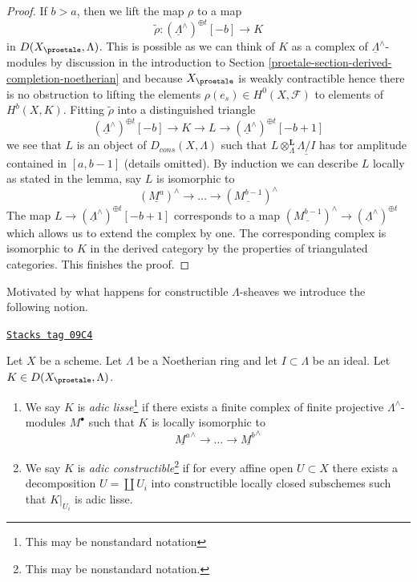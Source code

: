 \begin{proof}
\medskip\noindent
If $b > a$, then we lift the map $\rho$ to a map
$$
\tilde \rho : (\underline{\Lambda}^\wedge)^{\oplus t}[-b] \longrightarrow K
$$
in $D(X_\proetale, \Lambda)$. This is possible as we can think of
$K$ as a complex of $\underline{\Lambda}^\wedge$-modules by
discussion in the introduction to
Section \ref{proetale-section-derived-completion-noetherian}
and because $X_\proetale$ is weakly contractible
hence there is no obstruction to lifting the elements
$\rho(e_s) \in H^0(X, \mathcal{F})$ to elements of $H^b(X, K)$.
Fitting $\tilde \rho$ into a distinguished triangle
$$
(\underline{\Lambda}^\wedge)^{\oplus t}[-b] \to K \to L \to
(\underline{\Lambda}^\wedge)^{\oplus t}[-b + 1]
$$
we see that $L$ is an object of $D_{cons}(X, \Lambda)$ such
that $L \otimes_\Lambda^\mathbf{L} \underline{\Lambda/I}$
has tor amplitude contained in $[a, b - 1]$ (details omitted).
By induction we can describe $L$ locally as stated in the lemma, say
$L$ is isomorphic to
$$
(\underline{M^a})^\wedge \to \ldots \to (\underline{M^{b - 1}})^\wedge
$$
The map
$L \to (\underline{\Lambda}^\wedge)^{\oplus t}[-b + 1]$
corresponds to a map
$(\underline{M^{b - 1}})^\wedge \to (\underline{\Lambda}^\wedge)^{\oplus t}$
which allows us to extend the complex by one. The corresponding
complex is isomorphic to $K$ in the derived category by the properties
of triangulated categories. This finishes the proof.
\end{proof}

Motivated by what happens for constructible $\Lambda$-sheaves
we introduce the following notion.

\begin{definition}
\label{proetale-definition-adic-constructible}
\href{https://stacks.math.columbia.edu/tag/09C4}{\texttt{Stacks tag 09C4}}

Let $X$ be a scheme. Let $\Lambda$ be a Noetherian ring and let
$I \subset \Lambda$ be an ideal. Let $K \in D(X_\proetale, \Lambda)$.
\begin{enumerate}
\item We say $K$ is {\it adic lisse}\footnote{This may be
nonstandard notation} if there exists a finite complex of finite
projective $\Lambda^\wedge$-modules $M^\bullet$ such that
$K$ is locally isomorphic to
$$
\underline{M^a}^\wedge \to \ldots \to \underline{M^b}^\wedge
$$
\item We say $K$ is {\it adic constructible}\footnote{This may be
nonstandard notation.} if for every affine open $U \subset X$
there exists a decomposition $U = \coprod U_i$ into
constructible locally closed subschemes such that $K|_{U_i}$
is adic lisse.
\end{enumerate}
\end{definition}

